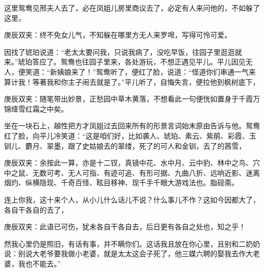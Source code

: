 \begin{parag}
    这里鸳鸯见邢夫人去了，必在凤姐儿房里商议去了，必定有人来问他的，不如躲了这里，\begin{note}庚辰双夹：终不免女儿气，不知躲在哪里方无人来罗唣，写得可怜可爱。\end{note}因找了琥珀说道：“老太太要问我，只说我病了，没吃早饭，往园子里逛逛就来。”琥珀答应了。鸳鸯也往园子里来，各处游玩，不想正遇见平儿。平儿因见无人，便笑道：“新姨娘来了！”鸳鸯听了，便红了脸，说道：“怪道你们串通一气来算计我！等著我和你主子闹去就是了。”平儿听了，自悔失言，便拉他到枫树底下，\begin{note}庚辰双夹：随笔带出妙景，正愁园中草木黄落，不想看此一句便恍如置身于千霞万锦绛雪红霜之中矣。\end{note}坐在一块石上，越性把方才凤姐过去回来所有的形景言词始末原由告诉与他。鸳鸯红了脸，向平儿冷笑道：“这是咱们好，比如袭人、琥珀、素云、紫鹃、彩霞、玉钏儿、麝月、翠墨，跟了史姑娘去的翠缕，死了的可人和金钏，去了的茜雪，\begin{note}庚辰双夹：余按此一算，亦是十二钗，真镜中花、水中月、云中豹、林中之鸟、穴中之鼠、无数可考、无人可指、有迹可追、有形可据、九曲八折、远响近影、迷离烟灼、纵横隐现、千奇百怪、眩目移神、现千手千眼大游戏法也。脂砚斋。\end{note}连上你我，这十来个人，从小儿什么话儿不说？什么事儿不作？这如今因都大了，各自干各自的去了，\begin{note}庚辰双夹：此语已可伤，犹未各自干各自去，后日更有各自之处也，知之乎！\end{note}然我心里仍是照旧，有话有事，并不瞒你们。这话我且放在你心里，且别和二奶奶说：别说大老爷要我做小老婆，就是太太这会子死了，他三媒六聘的娶我去作大老婆，我也不能去。”
\end{parag}


